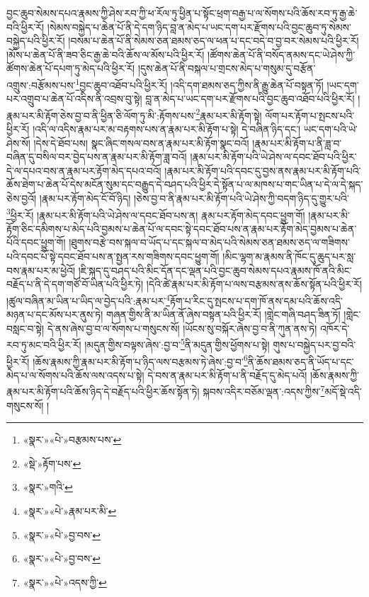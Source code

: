 བྱང་ཆུབ་སེམས་དཔའ་རྣམས་ཀྱི་ཤེས་རབ་ཀྱི་ཕ་རོལ་ཏུ་ཕྱིན་པ་སྟོང་ཕྲག་བརྒྱ་པ་ལ་སོགས་པའི་ཆོས་རབ་ཏུ་རྒྱ་ཆེ་བའི་ཕྱིར་རོ། །སེམས་བསྐྱེད་པ་ཆེན་པོ་ནི་དེ་དག་ཉིད་བླ་ན་མེད་པ་ཡང་དག་པར་རྫོགས་པའི་བྱང་ཆུབ་ཏུ་སེམས་བསྐྱེད་པའི་ཕྱིར་རོ། །བསམ་པ་ཆེན་པོ་ནི་སེམས་ཅན་ཐམས་ཅད་ལ་ཕན་པ་དང་བདེ་བ་བྱ་བར་སེམས་པའི་ཕྱིར་རོ། །མོས་པ་ཆེན་པོ་ནི་ཟབ་ཅིང་རྒྱ་ཆེ་བའི་ཆོས་ལ་མོས་པའི་ཕྱིར་རོ། །ཚོགས་ཆེན་པོ་ནི་བསོད་ནམས་དང་ཡེ་ཤེས་ཀྱི་ཚོགས་ཆེན་པོ་དཔག་ཏུ་མེད་པའི་ཕྱིར་རོ། །དུས་ཆེན་པོ་ནི་བསྐལ་པ་གྲངས་མེད་པ་གསུམ་དུ་བརྩོན་འགྲུས་:བརྩོམས་པས་\footnote{«སྣར་»«པེ་»བརྩམས་པས་}བྱང་ཆུབ་འཐོབ་པའི་ཕྱིར་རོ། །འདི་དག་ཐམས་ཅད་ཀྱིས་ནི་རྒྱུ་ཆེན་པོ་བསྟན་ཏོ། །ཡང་དག་པར་འགྲུབ་པ་ཆེན་པོ་འདིས་ནི་འབྲས་བུ་སྟེ། བླ་ན་མེད་པ་ཡང་དག་པར་རྫོགས་པའི་བྱང་ཆུབ་འཐོབ་པའི་ཕྱིར་རོ། །རྣམ་པར་མི་རྟོག་ཅེས་བྱ་བ་ནི་ཕྱིན་ཅི་ལོག་ཏུ་མི་:རྟོགས་པས་\footnote{«སྡེ་»རྟོག་པས་}རྣམ་པར་མི་རྟོག་སྟེ། ལོག་པར་རྟོག་པ་སྤངས་པའི་ཕྱིར་རོ། །འདི་ལ་འདིས་རྣམ་པར་མ་བརྟགས་པས་ན་རྣམ་པར་མི་རྟོག་པ་སྟེ། དེ་བཞིན་ཉིད་དང་། ཡང་དག་པའི་ཡེ་ཤེས་སོ། །དེས་དེ་ཐོབ་པས། སྣང་ཞིང་གསལ་བས་ན་རྣམ་པར་མི་རྟོག་སྣང་བའོ། །རྣམ་པར་མི་རྟོག་པ་ནི་ཟླ་བ་བཞིན་དུ་བསིལ་བར་བྱེད་པས་ན་རྣམ་པར་མི་རྟོག་ཟླ་བའོ། །རྣམ་པར་མི་རྟོག་པའི་ཡེ་ཤེས་ལ་དབང་ཐོབ་པའི་ཕྱིར་དེ་ལ་དཔའ་བས་ན་རྣམ་པར་རྟོག་མེད་དཔའ་བའོ། །རྣམ་པར་མི་རྟོག་པའི་དབང་དུ་བྱས་ནས་རྣམ་པར་མི་རྟོག་པའི་ཆོས་ཐེག་པ་ཆེན་པོ་དེས་མངོན་སུམ་དང་བརྒྱུད་དེ་བཤད་པའི་ཕྱིར་དེ་སྟོན་པ་ལ་མཁས་པ་གང་ཡིན་པ་དེ་ལ་དེ་སྐད་ཅེས་བྱའོ། །རྣམ་པར་རྟོག་མེད་ངོ་བོ་ཉིད། །ཅེས་བྱ་བ་ནི་རྣམ་པར་མི་རྟོག་པའི་ཡེ་ཤེས་ཀྱི་བདག་ཉིད་དུ་གྱུར་པའི་\footnote{«སྣར་»གའི་}ཕྱིར་རོ། །རྣམ་པར་མི་རྟོག་པའི་ཡེ་ཤེས་ལ་དབང་ཐོབ་པས་ན། རྣམ་པར་རྟོག་མེད་དབང་ཕྱུག་གོ། །རྣམ་པར་མི་རྟོག་ཅིང་དམིགས་པ་མེད་པའི་བྱམས་པ་ཆེན་པོ་ལ་དབང་སྟེ་དབང་ཐོབ་པས་ན་རྣམ་པར་རྟོག་མེད་བྱམས་པ་ཆེན་པོའི་དབང་ཕྱུག་གོ། །ཐུགས་བརྩེ་བས་སྐལ་བ་ཡོད་པ་དང་སྐལ་བ་མེད་པའི་སེམས་ཅན་ཐམས་ཅད་ལ་གཟིགས་པའི་དབང་པོ་སྟེ་དབང་ཐོབ་པས་ན་སྤྱན་རས་གཟིགས་དབང་ཕྱུག་གོ། །མིང་ལྷག་མ་རྣམས་ནི་ཁོང་དུ་ཆུད་པར་སླ་བས་རྣམ་པར་མ་ཕྱེའོ། །ཇི་སྐད་དུ་བཤད་པའི་མིང་དོན་དང་ལྡན་པའི་བྱང་ཆུབ་སེམས་དཔའ་རྣམས་ཁོ་ནའི་མིང་བརྗོད་པ་ནི་དེ་དག་གཙོ་བོ་ཡིན་པའི་ཕྱིར་ཏེ། །དེའི་ཚེ་རྣམ་པར་མི་རྟོག་པ་ལས་བརྩམས་ནས་ཆོས་སྟོན་པའི་ཕྱིར་རོ། །ཚུལ་བཞིན་མ་ཡིན་པ་ཡིད་ལ་བྱེད་པའི་:རྣམ་པར་\footnote{«སྣར་»«པེ་»རྣམ་པར་མི་}རྟོག་པ་རིང་དུ་སྤངས་པ་དག་ཁོ་ནས་དམ་པའི་ཆོས་འདི་མཉན་པ་དང་མོས་པར་ནུས་ཏེ། གཞན་གྱིས་ནི་མ་ཡིན་ནོ་ཞེས་བསྟན་པའི་ཕྱིར་རོ། །གླེང་གཞི་བཤད་ཟིན་ཏོ། །གླེང་བསླང་བ་སྟེ། དེ་ནས་ཞེས་བྱ་བ་ལ་སོགས་པ་གསུངས་སོ། །ཡོངས་སུ་བསྐོར་ཞེས་བྱ་བ་ནི་ཀུན་ནས་ཏེ། འཁོར་དེ་རབ་ཏུ་མང་བའི་ཕྱིར་རོ། །མདུན་གྱིས་བལྟས་ཞེས་:བྱ་བ་\footnote{«སྣར་»«པེ་»བྱ་བས་}ནི་མདུན་གྱིས་ཕྱོགས་པ་སྟེ། གུས་པ་བསྐྱེད་པར་བྱ་བའི་ཕྱིར་རོ། །ཆོས་རྣམས་ཀྱི་རྣམ་པར་མི་རྟོག་པ་ཉིད་ལས་བརྩམས་ཏེ་ཞེས་:བྱ་བ་\footnote{«སྣར་»«པེ་»བྱ་བས་}ནི་ཆོས་ཐམས་ཅད་ནི་ཡོད་པ་དང་མེད་པ་ལ་སོགས་པའི་ཆོས་ལས་འདས་པ་སྟེ། དེ་བས་ན་རྣམ་པར་མི་རྟོག་པ་ནི་བརྗོད་དུ་མེད་པའོ། །ཆོས་རྣམས་ཀྱི་རྣམ་པར་མི་རྟོག་པའི་ཆོས་ཉིད་དེ་བརྗོད་པའི་ཕྱིར་ཆོས་སྟོན་ཏེ། སྐབས་འདིར་བཅོམ་ལྡན་:འདས་ཀྱིས་\footnote{«སྣར་»«པེ་»འདས་ཀྱི་}མདོ་སྡེ་འདི་གསུངས་སོ། །
